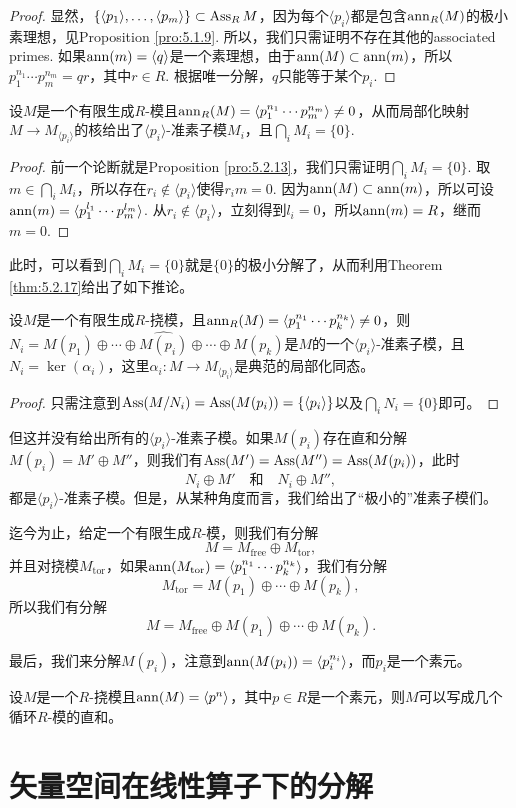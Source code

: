 \begin{proof}
    显然，$\{\langle p_1\rangle ,\dots,\langle p_m\rangle \}\subset \operatorname{Ass}_RM$，因为每个$\langle p_i\rangle$都是包含$\operatorname{ann}_R(M)$的极小素理想，见Proposition \ref{pro:5.1.9}. 所以，我们只需证明不存在其他的associated primes. 如果$\operatorname{ann}(m)=\langle q\rangle$是一个素理想，由于$\operatorname{ann}(M)\subset \operatorname{ann}(m)$，所以$p_1^{n_1}\cdots p_m^{n_m}=qr$，其中$r\in R$. 根据唯一分解，$q$只能等于某个$p_i$.
\end{proof}

 \begin{pro}
    设$M$是一个有限生成$R$-模且$\operatorname{ann}_R(M)=\langle p_1^{n_1}\cdots p_m^{n_m}\rangle \neq 0$，从而局部化映射$M\to M_{\langle p_i\rangle}$的核给出了$\langle p_i\rangle$-准素子模$M_i$，且$\bigcap_{i}M_i=\{0\}$.
\end{pro}

\begin{proof}
    前一个论断就是Proposition \ref{pro:5.2.13}，我们只需证明$\bigcap_{i}M_i=\{0\}$. 取$m\in \bigcap_{i}M_i$，所以存在$r_i\not\in \langle p_i\rangle$使得$r_im=0$. 因为$\operatorname{ann}(M)\subset \operatorname{ann}(m)$，所以可设$\operatorname{ann}(m)=\langle p_1^{l_1}\cdots p_m^{l_m}\rangle$. 从$r_i\not\in \langle p_i\rangle$，立刻得到$l_i=0$，所以$\operatorname{ann}(m)=R$，继而$m=0$.
\end{proof}

此时，可以看到$\bigcap_i M_i=\{0\}$就是$\{0\}$的极小分解了，从而利用Theorem \ref{thm:5.2.17}给出了如下推论。

\begin{coro}
设$M$是一个有限生成$R$-挠模，且$\operatorname{ann}_R(M)=\langle p_1^{n_1}\cdots p_k^{n_k}\rangle \neq 0$，则$N_i=M(p_1)\oplus \cdots \oplus \widehat{M(p_i)}\oplus \cdots  \oplus M(p_k)$是$M$的一个$\langle p_i\rangle$-准素子模，且$N_i=\ker(\alpha_i)$，这里$\alpha_i:M\to M_{\langle p_i\rangle}$是典范的局部化同态。
\end{coro}

\begin{proof}
    只需注意到$\operatorname{Ass}(M/N_i)=\operatorname{Ass}(M(p_i))=\{\langle p_i\rangle\}$以及$\bigcap_i N_i=\{0\}$即可。
\end{proof}

但这并没有给出所有的$\langle p_i\rangle$-准素子模。如果$M(p_i)$存在直和分解$M(p_i)=M'\oplus M''$，则我们有$\operatorname{Ass}(M')=\operatorname{Ass}(M'')=\operatorname{Ass}(M(p_i))$，此时
\[
    N_i\oplus M'\quad \text{和}\quad  N_i\oplus M'',
\]
都是$\langle p_i\rangle$-准素子模。但是，从某种角度而言，我们给出了“极小的”准素子模们。

\begin{para}
迄今为止，给定一个有限生成$R$-模，则我们有分解
\[
    M=M_{\mathrm{free}}\oplus M_{\mathrm{tor}},
\]
并且对挠模$M_{\mathrm{tor}}$，如果$\operatorname{ann}(M_{\mathrm{tor}})=\langle p_1^{n_1}\cdots p_k^{n_k}\rangle$，我们有分解
\[
    M_{\mathrm{tor}}=M(p_1)\oplus \cdots  \oplus M(p_k),
\]
所以我们有分解
\[
    M=M_{\mathrm{free}}\oplus M(p_1)\oplus \cdots  \oplus M(p_k).
\]
\end{para}

最后，我们来分解$M(p_i)$，注意到$\operatorname{ann}(M(p_i))=\langle p_i^{n_i}\rangle$，而$p_i$是一个素元。

\begin{pro}
设$M$是一个$R$-挠模且$\operatorname{ann}(M)=\langle p^n\rangle$，其中$p\in R$是一个素元，则$M$可以写成几个循环$R$-模的直和。
\end{pro}

\section{矢量空间在线性算子下的分解}

